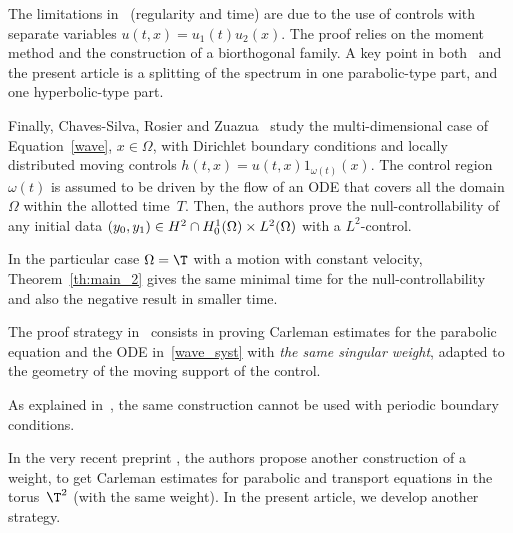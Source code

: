 The limitations in~\cite[Th.\,1.2]{martin_2013} (regularity and time) are due to the use of controls with separate variables $u(t,x)=u_1(t)u_2(x)$. The proof relies on the moment method and the construction of a biorthogonal family. A key point in both~\cite{martin_2013} and the present article is a splitting of the spectrum in one parabolic-type part, and one hyperbolic-type part.

Finally, Chaves-Silva, Rosier and Zuazua~\cite{chaves-silva_2014} study the multi-dimensional case of Equation~\eqref{wave}, $x\in \Omega$, with Dirichlet boundary conditions and locally distributed moving controls $h(t,x)=u(t,x)1_{\omega(t)}(x)$.
The control region $\omega(t)$ is assumed to be driven by the flow of an ODE that covers all the domain $\Omega$ within the allotted time~$T$.
Then, the authors prove the null-controllability of any initial data $(y_0,y_1)\in H^2\cap\nobreak H^1_0(\Omega) \times L^2(\Omega)$ with a $L^2$-control.

In the particular case $\Omega=\T$ with a motion with constant velocity, Theorem~\ref{th:main_2} gives the same minimal time for the null-controllability and also the negative result in smaller time.

The proof strategy in~\cite{chaves-silva_2014} consists in proving Carleman estimates for the parabol\-ic equation and the ODE in~\eqref{wave_syst} with \emph{the same singular weight}, adapted to the geometry of the moving support of the control.

As explained in~\cite[\S 5.2]{chaves-silva_2014}, the same construction cannot be used with periodic boundary conditions.

In the very recent preprint \cite{guzman_2019}, the authors propose another construction of a weight, to get Carleman estimates for parabolic and transport equations in the torus~$\T^2$ (with the same weight). In the present article, we develop another strategy.

